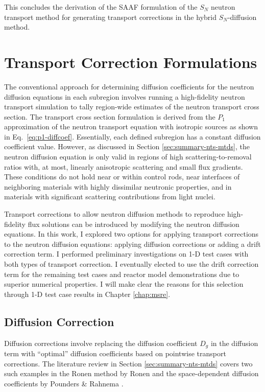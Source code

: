 This concludes the derivation of the \gls{SAAF} formulation of the $S_N$ neutron transport method
for generating transport corrections in the hybrid $S_N$-diffusion method.

\section{Transport Correction Formulations} \label{sec:transport-correction}

The conventional approach for determining diffusion coefficients for the neutron diffusion
equations in each subregion involves
running a high-fidelity neutron transport simulation to tally region-wide estimates of the neutron
transport cross section. The transport cross section formulation is derived from the $P_1$
approximation of the neutron transport equation with isotropic sources \cite{bell_nuclear_1970} as
shown in Eq.\ \ref{eq:p1-diffcoef}.
Essentially, each defined subregion has a constant diffusion coefficient value. However, as
discussed in Section \ref{sec:summary-nts-mtds}, the neutron diffusion
equation is only valid in regions of high scattering-to-removal ratios with, at most, linearly
anisotropic scattering and small flux gradients. These conditions do not hold near or within
control rods, near interfaces of neighboring materials with highly dissimilar neutronic properties,
and in materials with significant scattering contributions from light nuclei.

Transport corrections to allow neutron diffusion methods to reproduce high-fidelity flux solutions
can be introduced by modifying the neutron diffusion equations.
In this work, I explored two options for applying
transport corrections to the neutron diffusion equations: applying
diffusion corrections or adding a drift correction term.
I performed preliminary investigations on 1-D test cases with both types of transport correction. I
eventually elected to use the drift correction term for the remaining test cases and reactor model
demonstrations due to superior numerical properties. I will make clear the reasons for this
selection through 1-D test case results in Chapter \ref{chap:msre}.

\subsection{Diffusion Correction} \label{sec:diffusion-correction}

Diffusion corrections involve replacing the diffusion coefficient $D_g$ in the
diffusion term with ``optimal'' diffusion coefficients based on
pointwise transport corrections. The literature review in Section \ref{sec:summary-nts-mtds} covers
two such
examples in the Ronen method by Ronen \cite{ronen_accurate_2004} and the space-dependent diffusion
coefficients by Pounders \& Rahnema \cite{pounders_diffusion_2009}.

